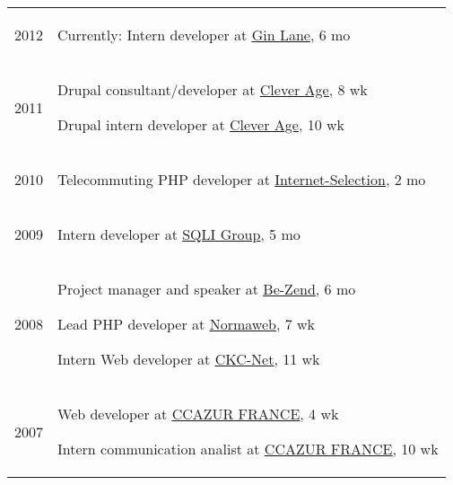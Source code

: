 \documentclass[letterpaper]{article}
\renewenvironment{itemize}{
    \begin{list}{}{
        \setlength{\leftmargin}{1.5em}
    }
}{
    \end{list}
}
\begin{document}
        \setlength{\tabcolsep}{0.6cm}
        \begin{tabular}{p{1cm}p{\textwidth}}
            \large{2012} & \begin{itemize}
                \item Currently: Intern developer at \uline{\href{http://www.ginlanemedia.com}{Gin Lane}}, 6 mo
            \end{itemize} \\
            \large{2011} & \begin{itemize}
                \item Drupal consultant/developer at \uline{\href{http://www.cleverage.com}{Clever Age}}, 8 wk
                \item Drupal intern developer at \uline{\href{http://www.cleverage.com}{Clever Age}}, 10 wk
            \end{itemize} \\
            \large{2010} &  \begin{itemize}
                \item Telecommuting PHP developer at \uline{\href{http://www.internet-selection.net}{Internet-Selection}}, 2 mo
            \end{itemize} \\
            \large{2009} &  \begin{itemize}
                \item Intern developer at \uline{\href{http://www.sqli.com}{SQLI Group}}, 5 mo
            \end{itemize} \\
            \large{2008} &  \begin{itemize}
                \item Project manager and speaker at \uline{\href{htt://www.be-zend.org}{Be-Zend}}, 6 mo
                \item Lead PHP developer at \uline{\href{http://www.normaweb.fr}{Normaweb}}, 7 wk
                \item Intern Web developer at \uline{\href{http://www.ckc-net.com}{CKC-Net}}, 11 wk
            \end{itemize} \\
            \large{2007} &  \begin{itemize}
                \item Web developer at \uline{\href{http://www.ccazur.com}{CCAZUR FRANCE}}, 4 wk
                \item Intern communication analist at \uline{\href{http://www.ccazur.com}{CCAZUR FRANCE}}, 10 wk
            \end{itemize}
        \end{tabular}
        
\end{document}
